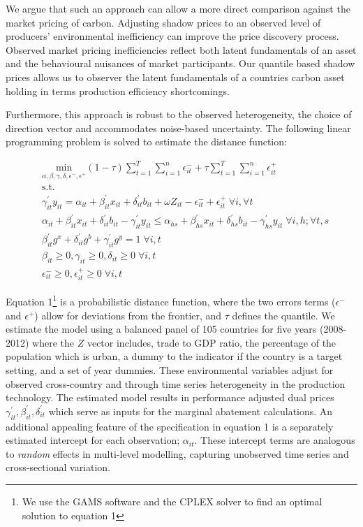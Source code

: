 \documentclass[
  10pt,
]{article}
\begin{document}
We argue that such an approach can allow a more direct comparison against the market pricing of carbon.  Adjusting shadow prices to an observed level of producers' environmental inefficiency can improve the price discovery process.  Observed market pricing inefficiencies reflect both latent fundamentals of an asset and the behavioural nuisances of market participants. Our quantile based shadow prices allows us to observer the latent fundamentals of a countries carbon asset holding in terms production efficiency shortcomings.    

Furthermore, this approach is robust to the observed
heterogeneity, the choice of direction vector and accommodates
noise-based uncertainty. The following linear programming problem is
solved to estimate the distance function:

\begin{equation}
\begin{split}
& \underset{\alpha,\beta,\gamma,\delta,\epsilon^-,\epsilon^+}{\text{min}}
 (1-\tau) \sum^{T}_{t=1} \sum^{n}_{i=1}\epsilon^-_{it} + \tau \sum^{T}_{t=1}  \sum^{n}_{i=1}\epsilon^+_{it}  \\
&\text{s.t.} \\
&\gamma^{'}_{it}y_{it}=\alpha_{it}+\beta^{'}_{it}x_{it}+\delta^{'}_{it}b_{it} + \omega Z_{it} -\epsilon^-_{it}+\epsilon^+_{it} \; \forall i ,\forall t \\
&\alpha_{it}+\beta^{'}_{it}x_{it}+\delta^{'}_{it}b_{it}-\gamma^{'}_{it}y_{it} \leq \alpha_{hs}+\beta^{'}_{hs}x_{it}+\delta^{'}_{hs}b_{it}-\gamma^{'}_{hs}y_{it} \; \forall i,h ; \forall t,s \\
& \beta^{'}_{it}g^x+\delta^{'}_{it}g^b+\gamma^{'}_{it}g^y=1 \; \forall i,t\\
& \beta_{it} \geq0,\gamma_{it} \geq0,\delta_{it} \geq0 \; \forall i,t \\
& \epsilon^-_{it} \geq0, \epsilon^+_{it} \geq 0 \; \forall i,t
\end{split}
\end{equation}

Equation 1\footnote{We
  use the GAMS software and the CPLEX solver to find an optimal solution
  to equation 1} is a probabilistic distance function, where the two errors
terms (\(\epsilon^-\) and \(\epsilon^+\)) allow for deviations from the
frontier, and \(\tau\) defines the quantile. We estimate the model using
a balanced panel of 105 countries for five years (2008-2012) where the
\(Z\) vector includes, trade to GDP ratio, the percentage of the
population which is urban, a dummy to the indicator if the country is a
target setting, and a set of year dummies. These environmental variables
adjust for observed cross-country and through time series heterogeneity in the
production technology. The estimated model results in performance
adjusted dual prices \(\gamma^{'}_{it},\beta^{'}_{it} ,\delta^{'}_{it}\)
which serve as inputs for the marginal abatement calculations. An
additional appealing feature of the specification in equation 1 is a
separately estimated intercept for each observation; \(\alpha_{it}\).
These intercept terms are analogous to \emph{random} effects in
multi-level modelling, capturing unobserved time series and
cross-sectional variation.
\end{document}
